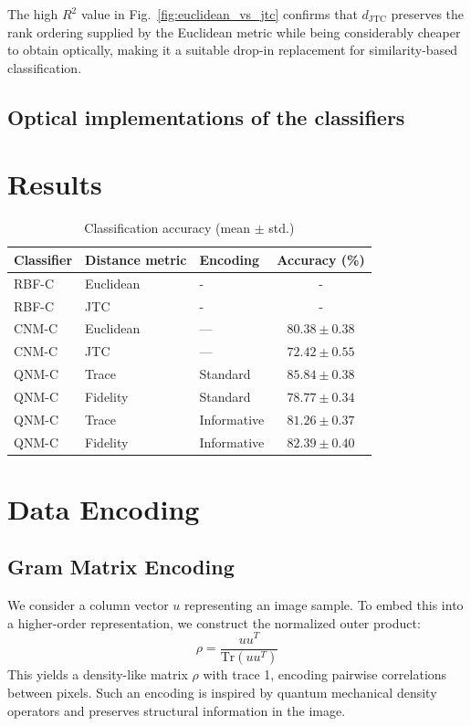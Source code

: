 \documentclass[twocolumn]{article} %
\begin{document}
The high \(R^{2}\) value in Fig.~\ref{fig:euclidean_vs_jtc} confirms that
\(d_{\text{JTC}}\) preserves the rank ordering supplied by the Euclidean
metric while being considerably cheaper to obtain optically, making it a
suitable drop-in replacement for similarity-based classification.

\subsection{Optical implementations of the classifiers}
\label{subsec:optical-qnm}


\section{Results}

\begin{table}[htbp]
  \centering
  \caption{Classification accuracy (mean $\pm$ std.)}
  \label{tab:cls-results}
  \begin{tabular}{@{}lll c@{}}
    \toprule
    Classifier & Distance metric & Encoding & Accuracy (\%)\\ 
    \midrule
    RBF-C & Euclidean & - & - \\
    RBF-C & JTC & - & - \\[2pt]
    CNM-C & Euclidean & — & $80.38 \pm 0.38$ \\ 
    CNM-C & JTC & — & $72.42 \pm 0.55$ \\[2pt]
    QNM-C & Trace     & Standard     & \textbf{$85.84 \pm 0.38$} \\ 
    QNM-C & Fidelity  & Standard     & $78.77 \pm 0.34$ \\[2pt]
    QNM-C & Trace     & Informative  & $81.26 \pm 0.37$ \\ 
    QNM-C & Fidelity  & Informative  & \textbf{$82.39 \pm 0.40$} \\ 
    \bottomrule
  \end{tabular}
\end{table}




\section{Data Encoding}
\subsection{Gram Matrix Encoding}

We consider a column vector $u$ representing an image sample. To embed this into a higher-order representation, we construct the normalized outer product:
\[
\rho = \frac{uu^T}{\text{Tr}(uu^T)}
\]
This yields a density-like matrix $\rho$ with trace 1, encoding pairwise correlations between pixels. Such an encoding is inspired by quantum mechanical density operators and preserves structural information in the image.
\end{document}
